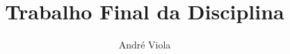 \documentclass{article}
\title{Trabalho Final da Disciplina}
\author{André Viola}
\begin{document}
  \onehalfspacing

\maketitle
\end{document}
